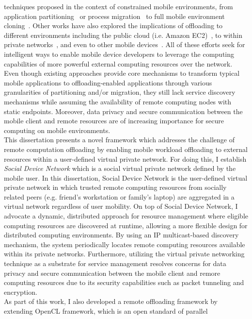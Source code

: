 techniques proposed in the context of constrained mobile environments,
from application partitioning~\cite{maui} or process
migration~\cite{hung} to full mobile environment
cloning~\cite{clonecloud}.
%
Other works have also explored the implications of offloading to
different environments including the public cloud (i.e. Amazon
EC2)~\cite{hung}, to within private networks~\cite{shigeru}, and even to
other mobile devices~\cite{serendipity}.
%
All of these efforts seek for intelligent ways to enable mobile device
developers to leverage the computing capabilities of more powerful
external computing resources over the network.
%
Even though existing approaches provide core mechanisms to transform
typical mobile applications to offloading-enabled applications through
various granularities of partitioning and/or migration, they still lack
service discovery mechanisms while assuming the availability of remote
computing nodes with static endpoints.
%
Moreover, data privacy and secure communication between the mobile
client and remote resources are of increasing importance for secure
computing on mobile environments.\\
%
This dissertation presents a novel framework which addresses the challenge
of remote computation offloading by enabling mobile workload offloading
to external resources within a user-defined virtual private network.
%
For doing this, I establish \textit{Social Device Network} which is a social
virtual private network defined by the mobile user.
%
In this dissertation, Social Device Network is the user-defined virtual
private network in which trusted remote computing resources from
socially related peers (e.g. friend's workstation or family's laptop)
are aggregated in a virtual network regardless of user mobility.
%
On top of Social Device Network, I advocate a dynamic, distributed
approach for resource management where eligible computing resources are
discovered at runtime, allowing a more flexible design for distributed
computing environments.
%
By using an IP multicast-based discovery mechanism, the system
periodically locates remote computing resources available within its
private networks.
%
Furthermore, utilizing the virtual private networking technique as a
substrate for service management resolves concerns for data privacy and
secure communication between the mobile client and remore computing
resources due to its security capabilities such as packet tunneling and
encryption.\\
%
As part of this work, I also developed a remote offloading framework by
extending OpenCL framework, which is an open standard of parallel
